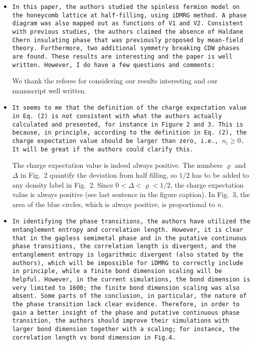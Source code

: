 \documentclass[aps,prb,superscriptaddress]{revtex4}
\begin{document}
\begin{itemize}

\item{\tt In this paper, the authors studied the spinless fermion model on the
honeycomb lattice at half-filling, using iDMRG method. A phase diagram
was also mapped out as functions of V1 and V2. Consistent with
previous studies, the authors claimed the absence of Haldane Chern
insulating phase that was previously proposed by mean-field theory.
Furthermore, two additional symmetry breaking CDW phases are found.
These results are interesting and the paper is well written. However,
I do have a few questions and comments:}

We thank the referee for considering our results interesting and our manuscript well written.

\item{\tt It seems to me that the definition of the charge expectation value
in Eq. (2) is not consistent with what the authors actually calculated
and presented, for instance in Figure 2 and 3. This is because, in
principle, according to the definition in Eq. (2), the charge
expectation value should be larger than zero, i.e., $n_i \geq 0$. It will be
great if the authors could clarify this.}

The charge expectation value is indeed always positive. The numbers $\varrho$ and $\Delta$ in Fig.~2 quantify the deviation from half filling, so $1/2$ has to be added to any density label in Fig.~2. Since $0<\Delta<\varrho<1/2$, the charge expectation value is always positive (see last sentence in the figure caption). In Fig.~3, the area of the blue circles, which is always positive, is proportional to $n$.

\item{\tt In identifying the phase transitions, the authors have utilized the
entanglement entropy and correlation length. However, it is clear that
in the gapless semimetal phase and in the putative continuous phase
transitions, the correlation length is divergent, and the entanglement
entropy is logarithmic divergent (also stated by the authors), which
will be impossible for iDMRG to correctly include in principle, while
a finite bond dimension scaling will be helpful. However, in the
current simulations, the bond dimension is very limited to 1600; the
finite bond dimension scaling was also absent. Some parts of the
conclusion, in particular, the nature of the phase transition lack
clear evidence. Therefore, in order to gain a better insight of the
phase and putative continuous phase transition, the authors should
improve their simulations with larger bond dimension together with a
scaling; for instance, the correlation length vs bond dimension in
Fig.4.}


\end{itemize}
\end{document}
